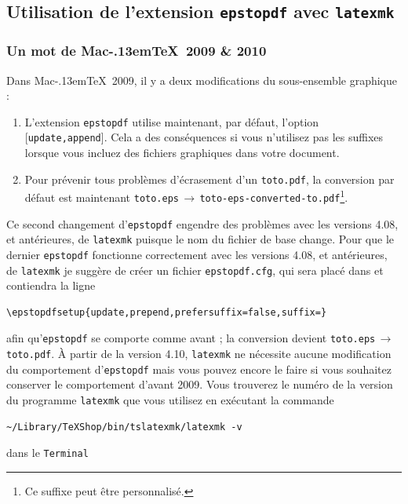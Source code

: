 \documentclass[11pt,french]{article}
\newcommand{\MacTeX}{Mac\kern-.13em\TeX}
\newcommand{\To}{\,\(\to\)\,}
\begin{document}
\subsection{Utilisation de l'extension \texttt{epstopdf} avec \texttt{latexmk}}

\subsubsection{Un mot de \MacTeX\ 2009 \& 2010}

Dans \MacTeX\ 2009, il y a deux modifications du sous-ensemble graphique :
\begin{enumerate}
\item 
L'extension \texttt{epstopdf} utilise maintenant, par défaut, l'option [\texttt{update,append}]. Cela a des conséquences si vous n'utilisez pas les suffixes lorsque vous incluez des fichiers graphiques dans votre document.
\item 
Pour prévenir tous problèmes d'écrasement d'un \texttt{toto.pdf}, la conversion par défaut est maintenant \texttt{toto.eps}\To\texttt{toto-eps-converted-to.pdf}\footnote{Ce suffixe peut être personnalisé.}.
\end{enumerate}

Ce second changement d'\texttt{epstopdf} engendre des problèmes avec les versions 4.08, et antérieures, de \texttt{latexmk} puisque le nom du fichier de base change. Pour que le dernier \texttt{epstopdf} fonctionne correctement avec les versions 4.08, et antérieures, de \texttt{latexmk} je suggère de créer un fichier \texttt{epstopdf.cfg}, qui sera placé dans  et contiendra la ligne

\begin{verbatim}
\epstopdfsetup{update,prepend,prefersuffix=false,suffix=}
\end{verbatim}
afin qu'\texttt{epstopdf} se comporte comme avant ; la conversion devient \texttt{toto.eps}\To\texttt{toto.pdf}. À partir de la version 4.10, \texttt{latexmk} ne nécessite aucune modification du comportement d'\texttt{epstopdf} mais vous pouvez encore le faire si vous souhaitez conserver le comportement d'avant 2009. Vous trouverez le numéro de la version du programme \texttt{latexmk} que vous utilisez en exécutant la commande

\begin{verbatim}
~/Library/TeXShop/bin/tslatexmk/latexmk -v
\end{verbatim}
dans le \texttt{Terminal}
\end{document}
